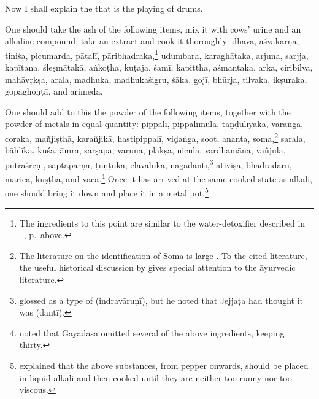 \begin{translation}
    
    \item[1] Now I shall explain the  that is the playing of 
    drums.
    
    \item[3] 
     One should take the ash of the following items, mix it with 
     cows' urine and an alkaline compound, take an extract and cook 
     it thoroughly:
     \gls{dhava},
     \gls{aśvakarṇa},
     \gls{tiniśa}, 
     \gls{picumarda}, 
     \gls{pāṭalī}, 
     \gls{pāribhadraka},\footnote{\label{drum-detox}The ingredients to this point
         are similar to the water-detoxifier described in \SS\ , 
         p.\,\pageref{water-detox} above.}
     \gls{udumbara}, 
     \gls{karaghāṭaka}, 
     \gls{arjuna},
     \gls{sarjja}, 
     \gls{kapītana}, 
     \gls{śleṣmātakā}, 
     \gls{aṅkoṭha},
     \gls{kuṭaja},
     \gls{śamī}, 
     \gls{kapittha},
     \gls{aśmantaka},
     \gls{arka},
     \gls{ciribilva}, 
     \gls{mahāvṛkṣa}, 
     \gls{arala}, 
     \gls{madhuka},
     \gls{madhukaśigru}, 
     \gls{śāka},
     \gls{gojī}, 
     \gls{bhūrja}, 
     \gls{tilvaka},
     \gls{ikṣuraka},
     \gls{gopaghoṇṭā}, 
     and
     \gls{arimeda}.
     
One should add to this the powder of the following items, together
with the powder of metals in equal quantity: %
\gls{pippalī}, \gls{pippalīmūla}, \gls{taṇḍulīyaka}, \gls{varāṅga},
\gls{coraka}, \gls{mañjiṣṭhā}, \gls{karañjikā}, \gls{hastipippalī},
\gls{viḍaṅga}, soot, \gls{ananta}, soma,\footnote{The literature on the identification of Soma
    is large \citep[passim]{wuja-2003}. To the cited literature, the
    useful historical discussion by \citet[449--455]{gvdb} gives special
    attention to the āyurvedic literature.} \gls{sarala}, \gls{bāhlīka},
    \gls{kuśa}, \gls{āmra}, \gls{sarṣapa}, \gls{varuṇa}, \gls{plakṣa},
    \gls{nicula}, \gls{vardhamāna}, \gls{vañjula}, \gls{putraśreṇī},
    \gls{saptaparṇa}, \gls{ṭuṇṭuka}, \gls{elavāluka},
    \gls{nāgadantī},\footnote{ glossed
         as a type of  (\gls{indravāruṇī}),
        but he noted that Jejjaṭa had thought it was 
        (\gls{dantī}).} \gls{ativiṣā}, \gls{bhadradāru}, \gls{marica},
        \gls{kuṣṭha}, and \gls{vacā}.\footnote{ noted
            that Gayadāsa omitted several of the above ingredients, keeping
            thirty.}  Once it has arrived at the same cooked state as alkali, one
            should bring it down and place it in a metal
            pot.\footnote{ explained that the above
                substances, from pepper onwards, should be placed in liquid alkali
                and then cooked until they are neither too runny nor too viscous. }
    
\end{translation}
